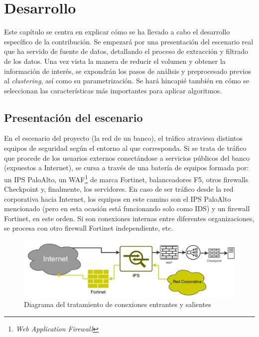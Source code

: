 \chapter{Desarrollo}\label{chap:desarrollo}

Este capítulo se centra en explicar cómo se ha llevado a cabo el desarrollo específico de la contribución.
Se empezará por una presentación del escenario real que ha servido de fuente de datos, detallando el proceso de extracción y filtrado de los datos.
Una vez vista la manera de reducir el volumen y obtener la información de interés, se expondrán los pasos de análisis y preprocesado previos al \emph{clustering}, así como su parametrización.
Se hará hincapié también en cómo se seleccionan las características más importantes para aplicar algoritmos.

\section{Presentación del escenario}\label{sec:presentaciondelescenario}

En el escenario del proyecto (la red de un banco), el tráfico atraviesa distintos equipos de seguridad según el entorno al que corresponda.
Si se trata de tráfico que procede de los usuarios externos conectándose a servicios públicos del banco (expuestos a Internet), se cursa a través de una batería de equipos formada por:
un IPS PaloAlto, un WAF\footnote{\emph{Web Application Firewall}} de marca Fortinet, balanceadores F5, otros firewalls Checkpoint y, finalmente, los servidores.
En caso de ser tráfico desde la red corporativa hacia Internet, los equipos en este camino son el IPS PaloAlto mencionado (pero en esta ocasión está funcionando solo como IDS) y un firewall Fortinet, en este orden.
Si son conexiones internas entre diferentes organizaciones, se procesa con otro firewall Fortinet independiente, etc.

\begin{figure}[h]
    \centering
    \captionsetup{width=12cm}
    \includegraphics[width=12cm]{contenido/fig/diagrama_red.pdf}
    \caption{Diagrama del tratamiento de conexiones entrantes y salientes}
    \label{fig:diagramared}
\end{figure}

